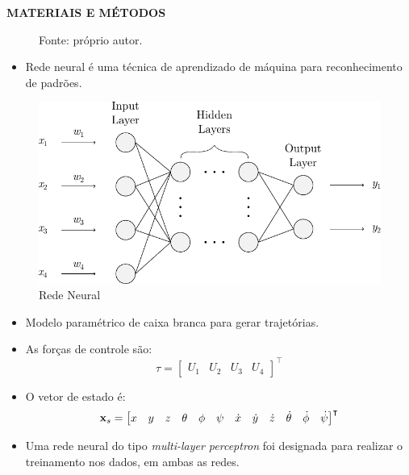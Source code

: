 \documentclass[serif,20pt]{beamer}
\begin{document}
\begin{frame}[t]
\begin{columns}[t]
\begin{block}{\centering\bfseries MATERIAIS E MÉTODOS}
\begin{figure}[H]
    {\footnotesize Fonte: próprio autor.}
    \label{fig:rede_neural}
\end{figure}
\begin{itemize}\justifying
    \item Rede neural é uma técnica de aprendizado de máquina para reconhecimento de padrões.\cite{haykin1999}
\end{itemize}
\begin{figure}
    \centering
    \caption{Rede Neural}
    \includegraphics[width=\columnwidth]{../../../report/figures/3review/nn/nn3_ppgem.pdf}
\end{figure}

\begin{itemize}\justifying
    \item Modelo paramétrico de caixa branca para gerar trajetórias.\cite{geronel2023}
    \item As forças de controle são:
    \begin{equation}
        \tau = \begin{bmatrix}
            U_1 & U_2 & U_3 & U_4
        \end{bmatrix}^{\intercal}
    \end{equation}
    \item O vetor de estado é:
    \begin{equation}
        \setcounter{MaxMatrixCols}{20}
        \mathbf{x}_s = \begin{bmatrix}
            x & y & z & \theta & \phi & \psi & \dot{x} & \dot{y} & \dot{z} & \dot{\theta} & \dot{\phi} & \dot{\psi}
        \end{bmatrix}^{\intercal}
    \end{equation}
    \item Uma rede neural do tipo \emph{multi-layer perceptron} foi designada para realizar o treinamento nos dados, em ambas as redes.
\end{itemize}
\vspace{1cm}
\end{block}


\end{columns}
\end{frame}
\end{document}
